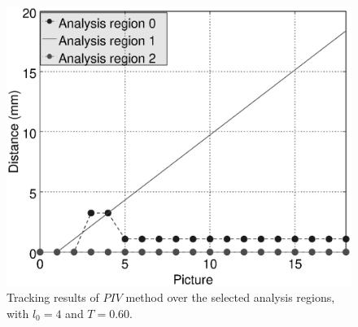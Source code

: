 \begin{figure}[H]
\centering
\includegraphics[width=\columnwidth]{numresult1-test-b.eps}
\caption{Tracking results of $PIV$ method over the selected analysis regions, with $l_0=4$ and $T=0.60$.}
\label{fig:numresult1testb}
\end{figure}


